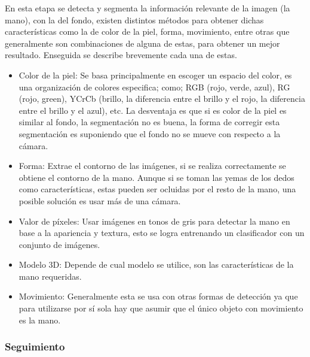 En esta etapa se detecta y segmenta la información relevante de la imagen (la mano), con la del fondo, existen distintos métodos para obtener dichas características como la de color de la piel, forma, movimiento, entre otras que generalmente son combinaciones de alguna de estas, para obtener un mejor resultado. Enseguida se describe brevemente cada una de estas.  
\begin{itemize}
\item Color de la piel: Se basa principalmente en escoger un espacio del color, es una organización de colores especifica; como; RGB (rojo, verde, azul), RG (rojo, green), YCrCb (brillo, la diferencia entre el brillo y el rojo, la diferencia entre el brillo y el azul), etc. La desventaja es que si es color de la piel es similar al fondo, la segmentación no es buena, la forma de corregir esta segmentación es suponiendo que el fondo no se mueve con respecto a la cámara.
\item Forma: Extrae el contorno de las imágenes, si se realiza correctamente se obtiene el contorno de la mano. Aunque si se toman las yemas de los dedos como características, estas pueden ser ocluidas por el resto de la mano, una posible solución es usar más de una cámara.  
\item Valor de p\'ixeles: Usar imágenes en tonos de gris para detectar la mano en base a la apariencia y textura, esto se logra entrenando un clasificador con un conjunto de imágenes.
	\item Modelo 3D: Depende de cual modelo se utilice, son las características de la mano requeridas. 
	\item Movimiento: Generalmente esta se usa con otras formas de detección ya que para utilizarse por sí sola hay que asumir que el único objeto con movimiento es la mano.
\end{itemize}

\subsubsection{Seguimiento}\label{sssec:EtapaSeguimiento}

